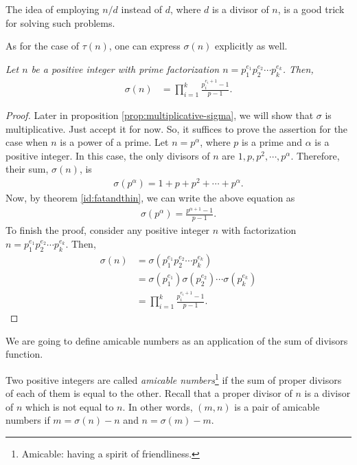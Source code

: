 \documentclass[12pt]{subfile}
\begin{document}
		\begin{note}
			The idea of employing $n/d$ instead of $d$, where $d$ is a divisor of $n$, is a good trick for solving such problems.
		\end{note}
	
	As for the case of $\tau(n)$, one can express $\sigma(n)$ explicitly as well.
		
		\begin{theorem}\slshape \label{thm:sigmaformula}
			Let $n$ be a positive integer with prime factorization $n=p_1^{e_1}p_2^{e_2}\cdots p_k^{e_k}$. Then,
			\begin{align*}
			\sigma(n) &= \prod_{i=1}^{k} \frac{p_i^{e_i+1}-1}{p-1}.
			\end{align*}
		\end{theorem}
		
		\begin{proof}
			Later in proposition \eqref{prop:multiplicative-sigma}, we will show that $\sigma$ is multiplicative. Just accept it for now. So, it suffices to prove the assertion for the case when $n$ is a power of a prime. Let $n=p^\alpha$, where $p$ is a prime and $\alpha$ is a positive integer. In this case, the only divisors of $n$ are $1, p, p^2, \cdots, p^\alpha$. Therefore, their sum, $\sigma(n)$, is
				\begin{align*}
					\sigma(p^\alpha) = 1+p+p^2+\cdots+p^\alpha.
				\end{align*}
			Now, by theorem \eqref{id:fatandthin}, we can write the above equation as
				\begin{align*}
					\sigma(p^\alpha) = \frac{p^{\alpha+1} - 1}{p-1}.
				\end{align*}
			To finish the proof, consider any positive integer $n$ with factorization $n=p_1^{e_1}p_2^{e_2}\cdots p_k^{e_k}$. Then,
			\begin{align*}
			\sigma(n) &=  \sigma(p_1^{e_1}p_2^{e_2}\cdots p_k^{e_k})\\
			&= \sigma(p_1^{e_1}) \sigma(p_2^{e_2}) \cdots \sigma(p_k^{e_k})\\
			&= \prod_{i=1}^{k} \frac{p_i^{e_i+1}-1}{p-1}.
			\end{align*}
		\end{proof}
	
	We are going to define amicable numbers as an application of the sum of divisors function.
	
	\begin{definition}\label{key}
		Two positive integers are called \textit{amicable numbers}\footnote{Amicable: having a spirit of friendliness.} if the sum of proper divisors of each of them is equal to the other. Recall that a proper divisor of $n$ is a divisor of $n$ which is not equal to $n$. In other words, $(m,n)$ is a pair of amicable numbers if $m=\sigma(n)-n$ and $n=\sigma(m)-m$.
	\end{definition}
	
\end{document}
